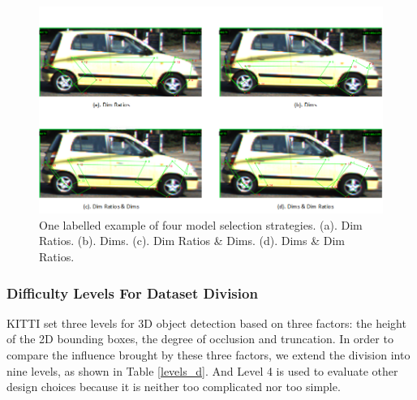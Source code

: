 \documentclass[a4paper,12pt]{article}
\begin{document}
\begin{figure}[h]		
	\includegraphics[width=1\textwidth]{model_selection_s.png}
	\caption[One labelled example of four model selection strategies.]{One labelled example of four model selection strategies. (a). Dim Ratios. (b). Dims. (c). Dim Ratios \& Dims. (d). Dims \& Dim Ratios. }
	\centering
	\label{figure:model_selection_s}
\end{figure}

\subsubsection{Difficulty Levels For Dataset Division}
KITTI set three levels for 3D object detection based on three factors: the height of the 2D bounding boxes, the degree of occlusion and truncation. In order to compare the influence brought by these three factors, we extend the division into nine levels, as shown in Table \ref{levels_d}. And Level 4 is used to evaluate other design choices because it is neither too complicated nor too simple.
\end{document}
